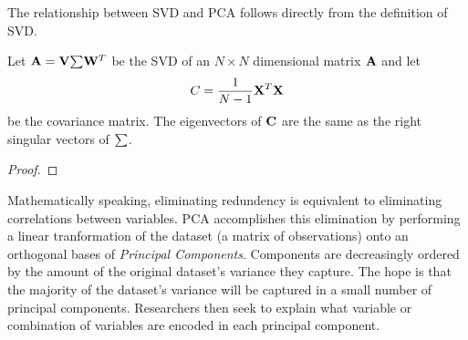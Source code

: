The relationship between \gls{SVD} and \gls{PCA} follows directly from the
definition of \gls{SVD}.

\begin{theorem}
  Let $\mathbf{A} = \mathbf{V}\mathbf{\sum}\mathbf{W}^T$ be the \gls{SVD} of an $N \times N$ dimensional matrix $\mathbf{A}$ and let \[C = \frac{1}{N - 1}
    \mathbf{X}^T\mathbf{X}\] be the covariance matrix.  The eigenvectors of $\mathbf{C}$ are the same as the right singular vectors of $\mathbf{\sum}$.
\end{theorem}

\begin{proof}
\end{proof}


Mathematically speaking, eliminating redundency is equivalent to eliminating correlations between variables.  \gls{PCA} accomplishes this
elimination by performing a linear tranformation of the dataset (a matrix of observations) onto an orthogonal bases of \textit{Principal Components}.
Components are decreasingly ordered by the amount of the original dataset's variance they capture.  The hope is that the majority of
the dataset's variance will be captured in a small number of principal components.  Researchers then seek to explain what variable or
combination of variables are encoded in each principal component.
